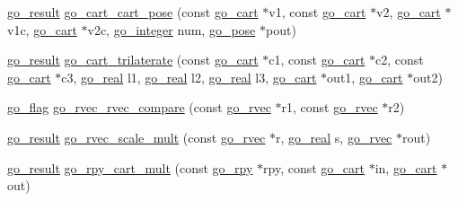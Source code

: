 \begin{DoxyCompactItemize}
\item 
\hyperlink{gotypes_8h_a55d48b38cd959f63c7e8db8337a9792a}{go\-\_\-result} \hyperlink{namespacegomotion_a78b82d69510763b3c86c26bca614e22e}{go\-\_\-cart\-\_\-cart\-\_\-pose} (const \hyperlink{structgomotion_1_1go__cart}{go\-\_\-cart} $\ast$v1, const \hyperlink{structgomotion_1_1go__cart}{go\-\_\-cart} $\ast$v2, \hyperlink{structgomotion_1_1go__cart}{go\-\_\-cart} $\ast$v1c, \hyperlink{structgomotion_1_1go__cart}{go\-\_\-cart} $\ast$v2c, \hyperlink{gotypes_8h_a7d30f606bb0f58ffe2b3bd71e5c8af5c}{go\-\_\-integer} num, \hyperlink{structgomotion_1_1go__pose}{go\-\_\-pose} $\ast$pout)
\item 
\hyperlink{gotypes_8h_a55d48b38cd959f63c7e8db8337a9792a}{go\-\_\-result} \hyperlink{namespacegomotion_a9444ada761a6e8be2db14846b955e276}{go\-\_\-cart\-\_\-trilaterate} (const \hyperlink{structgomotion_1_1go__cart}{go\-\_\-cart} $\ast$c1, const \hyperlink{structgomotion_1_1go__cart}{go\-\_\-cart} $\ast$c2, const \hyperlink{structgomotion_1_1go__cart}{go\-\_\-cart} $\ast$c3, \hyperlink{gotypes_8h_afd666a2393eebd71ee455846ac9def9b}{go\-\_\-real} l1, \hyperlink{gotypes_8h_afd666a2393eebd71ee455846ac9def9b}{go\-\_\-real} l2, \hyperlink{gotypes_8h_afd666a2393eebd71ee455846ac9def9b}{go\-\_\-real} l3, \hyperlink{structgomotion_1_1go__cart}{go\-\_\-cart} $\ast$out1, \hyperlink{structgomotion_1_1go__cart}{go\-\_\-cart} $\ast$out2)
\item 
\hyperlink{gotypes_8h_ae890d9a0ddecc0d3073622cc4312092d}{go\-\_\-flag} \hyperlink{namespacegomotion_a170969f552d3a76100734d6664069c02}{go\-\_\-rvec\-\_\-rvec\-\_\-compare} (const \hyperlink{structgomotion_1_1go__rvec}{go\-\_\-rvec} $\ast$r1, const \hyperlink{structgomotion_1_1go__rvec}{go\-\_\-rvec} $\ast$r2)
\item 
\hyperlink{gotypes_8h_a55d48b38cd959f63c7e8db8337a9792a}{go\-\_\-result} \hyperlink{namespacegomotion_a4cb3d0febaa9707a5e2978609d195d01}{go\-\_\-rvec\-\_\-scale\-\_\-mult} (const \hyperlink{structgomotion_1_1go__rvec}{go\-\_\-rvec} $\ast$r, \hyperlink{gotypes_8h_afd666a2393eebd71ee455846ac9def9b}{go\-\_\-real} s, \hyperlink{structgomotion_1_1go__rvec}{go\-\_\-rvec} $\ast$rout)
\item 
\hyperlink{gotypes_8h_a55d48b38cd959f63c7e8db8337a9792a}{go\-\_\-result} \hyperlink{namespacegomotion_ac89b091b7958b0916f0bfffc89022751}{go\-\_\-rpy\-\_\-cart\-\_\-mult} (const \hyperlink{structgomotion_1_1go__rpy}{go\-\_\-rpy} $\ast$rpy, const \hyperlink{structgomotion_1_1go__cart}{go\-\_\-cart} $\ast$in, \hyperlink{structgomotion_1_1go__cart}{go\-\_\-cart} $\ast$out)

\end{DoxyCompactItemize}
